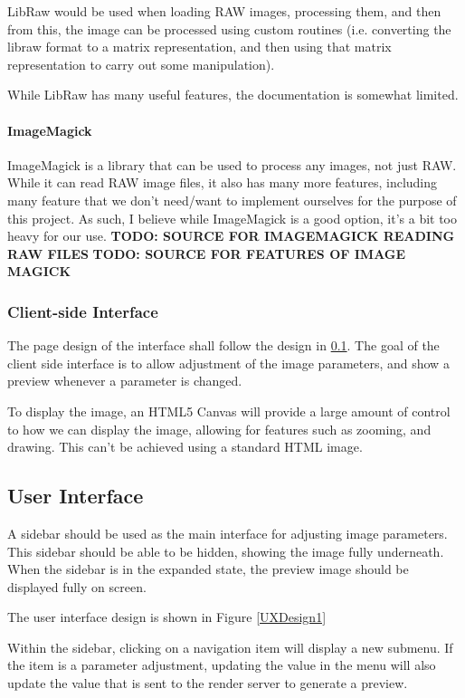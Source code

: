 \documentclass[12pt,a4paper]{article}
\begin{document}
LibRaw would be used when loading RAW images, processing them, and then from this,
the image can be processed using custom routines (i.e. converting the libraw format
to a matrix representation, and then using that matrix representation to carry out
some manipulation).

While LibRaw has many useful features, the documentation is somewhat limited.

\paragraph{ImageMagick}
ImageMagick is a library that can be used to process any images, not just RAW. While it can read
RAW image files, it also has many more features, including many feature that we don't need/want to
implement ourselves for the purpose of this project. As such, I believe while ImageMagick is a good option,
it's a bit too heavy for our use.
\textbf{TODO: SOURCE FOR IMAGEMAGICK READING RAW FILES}
\textbf{TODO: SOURCE FOR FEATURES OF IMAGE MAGICK}

\subsubsection{Client-side Interface}
  The page design of the interface shall follow the design in \ref{UserInterface}.
  The goal of the client side interface is to allow adjustment of the image parameters,
  and show a preview whenever a parameter is changed.

  To display the image, an HTML5 Canvas will provide a large amount of control to
  how we can display the image, allowing for features such as zooming, and drawing. This can't be
  achieved using a standard HTML image.

\subsection{User Interface}\label{UserInterface}
  A sidebar should be used as the main interface for adjusting image parameters.
  This sidebar should be able to be hidden, showing the image fully underneath.
  When the sidebar is in the expanded state, the preview image should be displayed
  fully on screen.

  The user interface design is shown in Figure \ref{UXDesign1}

  Within the sidebar, clicking on a navigation item will display a new submenu.
  If the item is a parameter adjustment, updating the value in the menu will also
  update the value that is sent to the render server to generate a preview.
\end{document}
